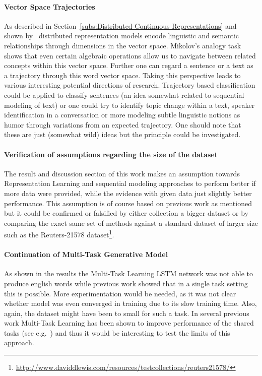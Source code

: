 \paragraph{Vector Space Trajectories} As described in Section~\ref{subs:Distributed Continuous Representations} and shown by~\cite{Mikolov:2013ac} distributed representation models encode linguistic and semantic relationships through dimensions in the vector space. Mikolov's analogy task shows that even certain algebraic operations allow us to navigate between related concepts within this vector space. Further one can regard a sentence or a text as a trajectory through this word vector space. Taking this perspective leads to various interesting potential directions of research. Trajectory based classification could be applied to classify sentences (an idea somewhat related to sequential modeling of text) or one could try to identify topic change within a text, speaker identification in a conversation or more modeling subtle linguistic notions as humor through variations from an expected trajectory. One should note that these are just (somewhat wild) ideas but the principle could be investigated.
\paragraph{Verification of assumptions regarding the size of the dataset} The result and discussion section of this work makes an assumption towards \gls{Representation Learning} and sequential modeling approaches to perform better if more data were provided, while the evidence with given data just slightly better performance. This assumption is of course based on previous work as mentioned but it could be confirmed or falsified by either collection a bigger dataset or by comparing the exact same set of methods against a standard dataset of larger size such as the Reuters-21578 dataset\footnote{\url{http://www.daviddlewis.com/resources/testcollections/reuters21578/}}.
\paragraph{Continuation of Multi-Task Generative Model} As shown in the results the Multi-Task Learning LSTM network was not able to produce english words while previous work showed that in a single task setting this is possible. More experimentation would be needed, as it was not clear whether model was even converged in training due to its slow training time. Also, again, the dataset might have been to small for such a task. In several previous work \gls{Multi-Task Learning} has been shown to improve performance of the shared tasks (see e.g.~\cite{Collobert:2008aa}) and thus it would be interesting to test the limits of this approach.
